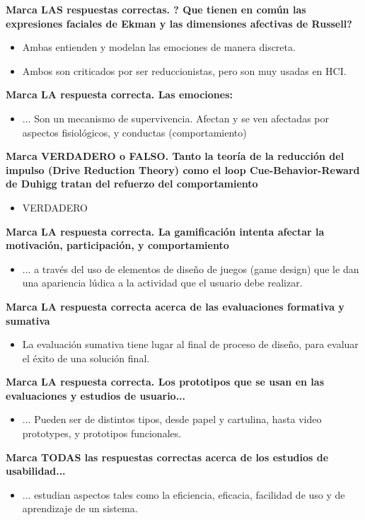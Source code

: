 \documentclass[12pt]{report} %
\begin{document}
\textbf{Marca LAS respuestas correctas. ? Que tienen en común las expresiones faciales de Ekman y las dimensiones afectivas de Russell?}
\begin{itemize}
  \item Ambas entienden y modelan las emociones de manera discreta.
  \item Ambos son criticados por ser reduccionistas, pero son muy usadas en HCI.
\end{itemize}

\textbf{Marca LA respuesta correcta. Las emociones:}
\begin{itemize}
  \item ... Son un mecanismo de supervivencia. Afectan y se ven afectadas por aspectos fisiológicos, y conductas (comportamiento)
\end{itemize}

\textbf{Marca VERDADERO o FALSO. Tanto la teoría de la reducción del impulso (Drive Reduction Theory) como el loop Cue-Behavior-Reward de Duhigg tratan del refuerzo del comportamiento}
\begin{itemize}
  \item VERDADERO
\end{itemize}

\textbf{Marca LA respuesta correcta. La gamificación intenta afectar la motivación, participación, y comportamiento}
\begin{itemize}
  \item ... a través del uso de elementos de diseño de juegos (game design) que le dan una apariencia lúdica a la actividad que el usuario debe realizar.
\end{itemize}

\textbf{Marca LA respuesta correcta acerca de las evaluaciones formativa y sumativa}
\begin{itemize}
  \item La evaluación sumativa tiene lugar al final de proceso de diseño, para evaluar el éxito de una solución final.
\end{itemize}

\textbf{Marca LA respuesta correcta. Los prototipos que se usan en las evaluaciones y estudios de usuario...}
\begin{itemize}
  \item ... Pueden ser de distintos tipos, desde papel y cartulina, hasta video prototypes, y prototipos funcionales. 
\end{itemize}

\textbf{Marca TODAS las respuestas correctas acerca de los estudios de usabilidad...}
\begin{itemize}
  \item ... estudian aspectos tales como la eficiencia, eficacia, facilidad de uso y de aprendizaje de un sistema.
\end{itemize}
\end{document}
